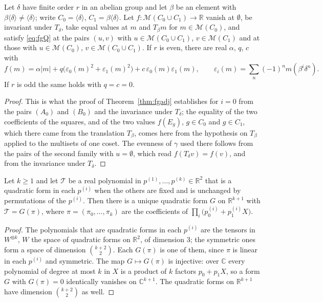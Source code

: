 \begin{lemma}\label{lem:twolevelabs}
Let $\delta$ have finite order $r$ in an abelian group and let $\beta$ be an element with $\beta\langle\delta\rangle\ne\langle\delta\rangle$; write $C_0=\langle\delta\rangle$, $C_1=\beta\langle\delta\rangle$. Let $f\colon\mathcal{M}(C_0\cup C_1)\to\mathbb{R}$ vanish at $\emptyset$, be invariant under $T_\delta$, take equal values at $m$ and $T_\beta m$ for $m\in\mathcal{M}(C_0)$, and satisfy \eqref{eq:fgQ} at the pairs $(u,v)$ with $u\in\mathcal{M}(C_0\cup C_1)$, $v\in\mathcal{M}(C_1)$ and at those with $u\in\mathcal{M}(C_0)$, $v\in\mathcal{M}(C_0\cup C_1)$. If $r$ is even, there are real $\alpha$, $q$, $c$ with
\[
f(m)=\alpha|m|+q\bigl(\varepsilon_0(m)^{2}+\varepsilon_1(m)^{2}\bigr)+c\,\varepsilon_0(m)\varepsilon_1(m),\qquad\varepsilon_i(m)=\sum_n(-1)^{n}m(\beta^{i}\delta^{n}).
\]
If $r$ is odd the same holds with $q=c=0$.
\end{lemma}
\begin{proof}
This is what the proof of Theorem~\ref{thm:fgadj} establishes for $i=0$ from the pairs $(A_0)$ and $(B_0)$ and the invariance under $T_\delta$; the equality of the two coefficients of the squares, and of the two values $f(E_g)$, $g\in C_0$ and $g\in C_1$, which there came from the translation $T_\beta$, comes here from the hypothesis on $T_\beta$ applied to the multisets of one coset. The evenness of $\gamma$ used there follows from the pairs of the second family with $u=\emptyset$, which read $f(T_\delta v)=f(v)$, and from the invariance under $T_\delta$.
\end{proof}

\begin{lemma}\label{lem:symquad}
Let $k\ge1$ and let $\mathcal{T}$ be a real polynomial in $p^{(1)},\dots,p^{(k)}\in\mathbb{R}^{2}$ that is a quadratic form in each $p^{(i)}$ when the others are fixed and is unchanged by permutations of the $p^{(i)}$. Then there is a unique quadratic form $G$ on $\mathbb{R}^{k+1}$ with $\mathcal{T}=G(\pi)$, where $\pi=(\pi_0,\dots,\pi_k)$ are the coefficients of $\prod_i\bigl(p^{(i)}_0+p^{(i)}_1X\bigr)$.
\end{lemma}
\begin{proof}
The polynomials that are quadratic forms in each $p^{(i)}$ are the tensors in $W^{\otimes k}$, $W$ the space of quadratic forms on $\mathbb{R}^{2}$, of dimension $3$; the symmetric ones form a space of dimension $\binom{k+2}{2}$. Each $G(\pi)$ is one of them, since $\pi$ is linear in each $p^{(i)}$ and symmetric. The map $G\mapsto G(\pi)$ is injective: over $\mathbb{C}$ every polynomial of degree at most $k$ in $X$ is a product of $k$ factors $p_0+p_1X$, so a form $G$ with $G(\pi)=0$ identically vanishes on $\mathbb{C}^{k+1}$. The quadratic forms on $\mathbb{R}^{k+1}$ have dimension $\binom{k+2}{2}$ as well.
\end{proof}

